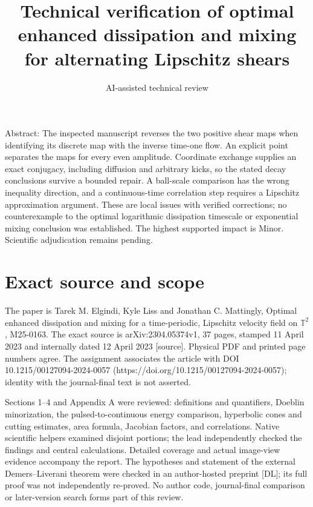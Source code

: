 \documentclass[10pt]{article}
\title{Technical verification of optimal enhanced dissipation and mixing for alternating Lipschitz shears}
\author{AI-assisted technical review}
\date{}
\begin{document}
\maketitle
Abstract: The inspected manuscript reverses the two positive shear maps when identifying its discrete map with the inverse time-one flow. An explicit point separates the maps for every even amplitude. Coordinate exchange supplies an exact conjugacy, including diffusion and arbitrary kicks, so the stated decay conclusions survive a bounded repair. A ball-scale comparison has the wrong inequality direction, and a continuous-time correlation step requires a Lipschitz approximation argument. These are local issues with verified corrections; no counterexample to the optimal logarithmic dissipation timescale or exponential mixing conclusion was established. The highest supported impact is Minor. Scientific adjudication remains pending.\par
\section*{Exact source and scope}
The paper is Tarek M. Elgindi, Kyle Liss and Jonathan C. Mattingly, Optimal enhanced dissipation and mixing for a time-periodic, Lipschitz velocity field on \(\mathbb T^2\), M25-0163. The exact source is arXiv:2304.05374v1, 37 pages, stamped 11 April 2023 and internally dated 12 April 2023 [source]. Physical PDF and printed page numbers agree. The assignment associates the article with DOI 10.1215/00127094-2024-0057 (https://doi.org/10.1215/00127094-2024-0057); identity with the journal-final text is not asserted.\par
Sections 1–4 and Appendix A were reviewed: definitions and quantifiers, Doeblin minorization, the pulsed-to-continuous energy comparison, hyperbolic cones and cutting estimates, area formula, Jacobian factors, and correlations. Native scientific helpers examined disjoint portions; the lead independently checked the findings and central calculations. Detailed coverage and actual image-view evidence accompany the report. The hypotheses and statement of the external Demers–Liverani theorem were checked in an author-hosted preprint [DL]; its full proof was not independently re-proved. No author code, journal-final comparison or later-version search forms part of this review.\par
\end{document}
